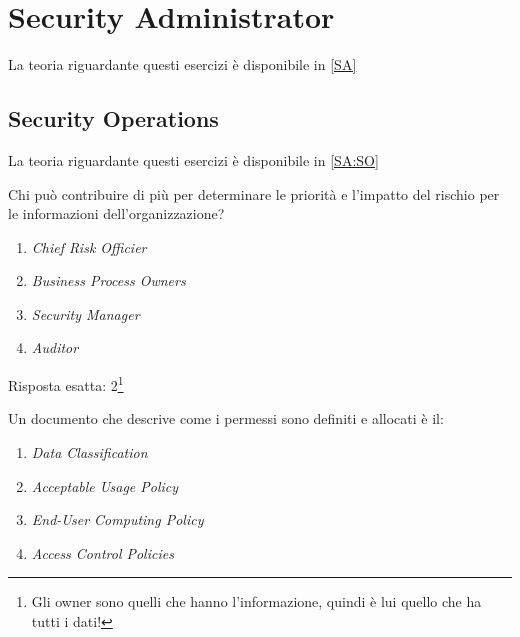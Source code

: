\section{Security Administrator}
\label{es:SA}

La teoria riguardante questi esercizi è disponibile in \ref{SA}

\subsection{Security Operations}
\label{esSA:SO}

La teoria riguardante questi esercizi è disponibile in \ref{SA:SO}

\begin{Exercise} [
  title={Quiz},
  label={esSA1}
  ]

  \Question Chi può contribuire di più per determinare le priorità e l'impatto 
del rischio per le informazioni dell'organizzazione?
\begin{enumerate}
 \item \textit{Chief Risk Officier}
 \item \textit{Business Process Owners}
 \item \textit{Security Manager}
 \item \textit{Auditor}
\end{enumerate}

\end{Exercise}

\begin{Answer} [
  ref={esSA1},
  number={1}
  ]

  \Question Risposta esatta: 2\footnote{Gli owner sono quelli che hanno 
l'informazione, quindi è lui quello che ha tutti i dati!}
\end{Answer}


\begin{Exercise} [
  title={Quiz},
  label={esSA2}
  ]

  \Question Un documento che descrive come i permessi sono definiti e allocati 
è il:
\begin{enumerate}
 \item \textit{Data Classification}
 \item \textit{Acceptable Usage Policy}
 \item \textit{End-User Computing Policy}
 \item \textit{Access Control Policies}
\end{enumerate}
  
\end{Exercise}

